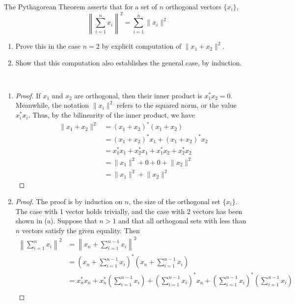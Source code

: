 \documentclass[12pt]{article}
\newenvironment{ex}[2][Exercise]{\begin{trivlist}
		\item[\hskip \labelsep {\bfseries #1}\hskip \labelsep {\bfseries #2.}]}{\end{trivlist}}
\newenvironment{sol}[1][Solution]{\begin{trivlist}
		\item[\hskip \labelsep {\bfseries #1:}]}{\end{trivlist}}
\begin{document}
\begin{ex}{2}
	The Pythagorean Theorem asserts that for a set of $n$ orthogonal vectors $\{x_i\}$,
	\[
	\left\lVert\sum_{i=1}^{n}x_i\right \rVert^2 = \sum_{i=1}^{n}\lVert x_i\rVert^2
	\]
	\begin{enumerate}[label=(\alph*)]
		\item Prove this in the case $n=2$ by explicit computation of $\lVert x_1 + x_2\rVert^2$.
		\item Show that this computation also establishes the general case, by induction.
	\end{enumerate}
\end{ex}

\begin{sol}
	\
	\begin{enumerate}[label=(\alph*)]
		\item \begin{proof}
			If $x_1$ and $x_2$ are orthogonal, then their inner product is $x_1^*x_2=0$. Meanwhile, the
			notation $\lVert x_i\rVert^2$ refers to the squared norm, or the value $x_i^*x_i$. Thus,
			by the bilinearity of the inner product, we have
			\begin{align*}
				\lVert x_1 + x_2\rVert^2 &= (x_1 + x_2)^*(x_1 + x_2)\\
				&= (x_1 + x_2)^* x_1 + (x_1 + x_2)^*x_2\\
				&= x_1^*x_1 + x_2^* x_1 + x_1^* x_2 + x_2^* x_2\\
				&= \lVert x_1\rVert^2 + 0 + 0 + \lVert x_2 \rVert^2\\
				&= \lVert x_1 \rVert^2 + \lVert x_2 \rVert^2
			\end{align*}
		\end{proof}
		\item \begin{proof}
			The proof is by induction on $n$, the size of the orthogonal set $\{x_i\}$. The case with 1 vector
			holds trivially, and the case with $2$ vectors has been shown in (a). Suppose that $n>1$ and
			that all orthogonal sets with less than $n$ vectors satisfy the given equality. Then
			\begin{align*}
				\left\lVert \sum_{i=1}^{n}x_i\right\rVert^2 &= \left\lVert x_n + \sum_{i=1}^{n-1}x_i\right\rVert^2\\
				&=\left(x_n + \sum_{i=1}^{n-1}x_i\right)^*\left(x_n + \sum_{i=1}^{n-1}x_i\right)\\
				&=x_n^* x_n + x_n^*\left(\sum_{i=1}^{n-1}x_i\right) + \left(\sum_{i=1}^{n-1}x_i\right)^*x_n
				+ \left(\sum_{i=1}^{n-1}x_i\right)^*\left(\sum_{i=1}^{n-1}x_i\right)\\

\end{align*}
\end{proof}
\end{enumerate}
\end{sol}
\end{document}
